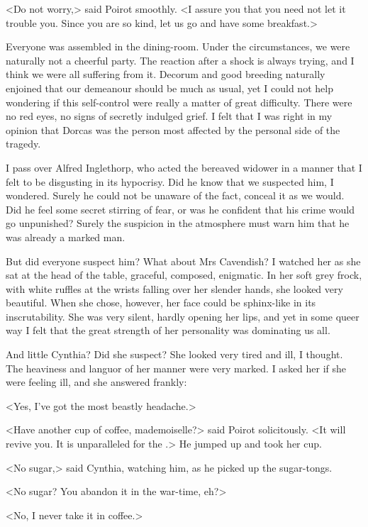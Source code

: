  <Do not worry,> said Poirot smoothly. <I assure you that you need not let it trouble you. Since you are so kind, let us go and have some breakfast.> 

 Everyone was assembled in the dining-room. Under the circumstances, we were naturally not a cheerful party. The reaction after a shock is always trying, and I think we were all suffering from it. Decorum and good breeding naturally enjoined that our demeanour should be much as usual, yet I could not help wondering if this self-control were really a matter of great difficulty. There were no red eyes, no signs of secretly indulged grief. I felt that I was right in my opinion that Dorcas was the person most affected by the personal side of the tragedy. 

 I pass over Alfred Inglethorp, who acted the bereaved widower in a manner that I felt to be disgusting in its hypocrisy. Did he know that we suspected him, I wondered. Surely he could not be unaware of the fact, conceal it as we would. Did he feel some secret stirring of fear, or was he confident that his crime would go unpunished? Surely the suspicion in the atmosphere must warn him that he was already a marked man. 

 But did everyone suspect him? What about Mrs Cavendish? I watched her as she sat at the head of the table, graceful, composed, enigmatic. In her soft grey frock, with white ruffles at the wrists falling over her slender hands, she looked very beautiful. When she chose, however, her face could be sphinx-like in its inscrutability. She was very silent, hardly opening her lips, and yet in some queer way I felt that the great strength of her personality was dominating us all. 

 And little Cynthia? Did she suspect? She looked very tired and ill, I thought. The heaviness and languor of her manner were very marked. I asked her if she were feeling ill, and she answered frankly: 

 <Yes, I've got the most beastly headache.> 

 <Have another cup of coffee, mademoiselle?> said Poirot solicitously. <It will revive you. It is unparalleled for the .> He jumped up and took her cup. 

 <No sugar,> said Cynthia, watching him, as he picked up the sugar-tongs. 

 <No sugar? You abandon it in the war-time, eh?> 

 <No, I never take it in coffee.> 

